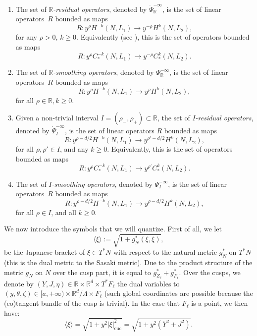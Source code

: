 \documentclass[JEP,XML,SOM,Unicode,NoFloatCountersInSection]{cedram}
\newcommand{\R}{\mathbb{R}}
\theoremstyle{plain}
\theoremstyle{definition}
\begin{document}
\begin{enumerate}
\item The set of \emph{$\R$-residual operators}, denoted by $\dot{\Psi}^{-\infty}_\R$, is the set of linear operators~$R$ bounded as maps
\[
R : y^{\rho} H^{-k}(N,L_1) \to y^{-\rho} H^k(N,L_2),
\]
for any $\rho > 0$, $k \geq 0$. Equivalently (see \cite[Prop.\,3.3]{Bonthonneau-Lefeuvre-19-1}), this is the set of operators bounded as maps
\[
R : y^{\rho} C^{-k}_*(N,L_1) \to y^{-\rho} C^k_*(N,L_2).
\]

\item The set of \emph{$\R$-smoothing operators}, denoted by $\Psi^{-\infty}_\R$, is the set of linear operators~$R$ bounded as maps
\[
R : y^{\rho} H^{-k}(N,L_1) \to y^{\rho} H^k(N,L_2),
\]
for all $\rho \in \R, k \geq 0$.

\item Given a non-trivial interval $I= (\rho_-, \rho_+)\subset \R$, the set of \emph{$I$-residual operators}, denoted by $\dot{\Psi}^{-\infty}_I$, is the set of linear operators $R$ bounded as maps
\[
R : y^{\rho - d/2}H^{-k}(N,L_1) \to y^{\rho' -d/2} H^k(N,L_2),
\]
for all $\rho, \rho'\in I$, and any $k \geq 0$. Equivalently, this is the set of operators bounded as maps
\[
R : y^{\rho}C^{-k}_\ast(N,L_1) \to y^{\rho'}C^k_\ast(N,L_2).
\]

\item The set of \emph{$I$-smoothing operators}, denoted by $\Psi^{-\infty}_I$, is the set of linear operators~$R$ bounded as maps
\[
R : y^{\rho - d/2}H^{-k}(N,L_1) \to y^{\rho -d/2} H^k(N,L_2),
\]
for all $\rho\in I$, and all $k\geq 0$.

\end{enumerate}

We now introduce the symbols that we will quantize. First of all, we let
\[
\langle \xi \rangle := \sqrt{1+g^*_N(\xi,\xi)},
\]
be the Japanese bracket of $\xi \in T^*N$ with respect to the natural metric $g_N^\ast$ on $T^\ast N$ (this is the dual metric to the Sasaki metric). Due to the product structure of the metric $g_N$ on $N$ over the cusp part, it is equal to $g_{Z_\ell}^\ast + g_{F_\ell}^\ast$. Over the cusps, we denote by $(Y,J,\eta) \in \R \times \R^d \times T^*F_{\ell}$ the dual variables to $(y,\theta,\zeta) \in [a,+\infty) \times \R^d/\Lambda \times F_{\ell}$ (such global coordinates are possible because the (co)tangent bundle of the cusp is trivial). In the case that $F_\ell$ is a point, we then have:
\[
\langle \xi \rangle = \sqrt{1+y^2|\xi|_{\mathrm{euc}}^2} = \sqrt{1+y^2(Y^2+J^2)}.
\]
\end{document}

